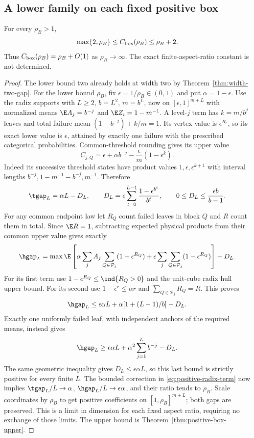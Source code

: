 \subsection{A lower family on each fixed positive box}
\begin{theorem}\label{thm:positive-box-lower}
For every $\rho_B>1$,
\[
 \max\{2,\rho_B\}\le C_{\rm box}(\rho_B)\le\rho_B+2.
\]
Thus $C_{\rm box}(\rho_B)=\rho_B+O(1)$ as $\rho_B\to\infty$.
The exact finite-aspect-ratio constant is not determined.
\end{theorem}
\begin{proof}
The lower bound two already holds at width two by
Theorem~\ref{thm:width-two-gap}. For the lower bound $\rho_B$, fix
$\epsilon=1/\rho_B\in(0,1)$ and put $\alpha=1-\epsilon$.
Use the radix supports with $L\ge2$, $b=L^2$, $m=b^L$, now on
$[\epsilon,1]^{m+L}$ with normalized means
$\E A_j=b^{-j}$ and $\E Z_i=1-m^{-1}$. A level-$j$ term has
$k=m/b^j$ leaves and total failure mean $(1-b^{-j})+k/m=1$.
Its vertex value is $\epsilon^{R_e}$, so its exact lower value is
$\epsilon$, attained by exactly one failure with the prescribed
categorical probabilities. Common-threshold rounding gives its upper
value
\[
 C_{j,Q}=\epsilon+\alpha b^{-j}
                      -\frac\epsilon m(1-\epsilon^k).
\]
Indeed its successive threshold states have product values
$1,\epsilon,\epsilon^{k+1}$ with interval lengths
$b^{-j},1-m^{-1}-b^{-j},m^{-1}$. Therefore
\begin{equation}\label{eq:positive-radix-term}
 \tgap_L=\alpha L-D_L,\qquad
 D_L=\epsilon\sum_{t=0}^{L-1}\frac{1-\epsilon^{b^t}}{b^t},
 \qquad0\le D_L\le\frac{\epsilon b}{b-1}.
\end{equation}
For any common endpoint law let $R_Q$ count failed leaves in block $Q$
and $R$ count them in total. Since $\E R=1$, subtracting expected
physical products from their common upper value gives exactly
\begin{equation}\label{eq:softened-coverage}
 \hgap_L=\max\E\left[
 \alpha\sum_jA_j\sum_{Q\in\mathcal P_j}(1-\epsilon^{R_Q})
 +\epsilon\sum_j\sum_{Q\in\mathcal P_j}(1-\epsilon^{R_Q})
 \right]-D_L.
\end{equation}
For its first term use $1-\epsilon^{R_Q}\le\ind\{R_Q>0\}$ and the
unit-cube radix hull upper bound. For its second use
$1-\epsilon^r\le\alpha r$ and $\sum_{Q\in\mathcal P_j}R_Q=R$.
This proves
\[
 \hgap_L\le\epsilon\alpha L+
                 \alpha[1+(L-1)/b]-D_L.
\]
Exactly one uniformly failed leaf, with independent anchors of the
required means, instead gives
\[
 \hgap_L\ge\epsilon\alpha L+
                    \alpha^2\sum_{j=1}^Lb^{-j}-D_L.
\]
The same geometric inequality gives $D_L\le\epsilon\alpha L$, so this
last bound is strictly positive for every finite $L$. The bounded
correction in \eqref{eq:positive-radix-term} now implies
$\tgap_L/L\to\alpha$, $\hgap_L/L\to\epsilon\alpha$, and their ratio
tends to $\rho_B$. Scale coordinates by $\rho_B$ to get positive
coefficients on $[1,\rho_B]^{m+L}$; both gaps are preserved. This is
a limit in dimension for each fixed aspect ratio, requiring no exchange
of those limits. The upper bound is Theorem~\ref{thm:positive-box-upper}.
\end{proof}

